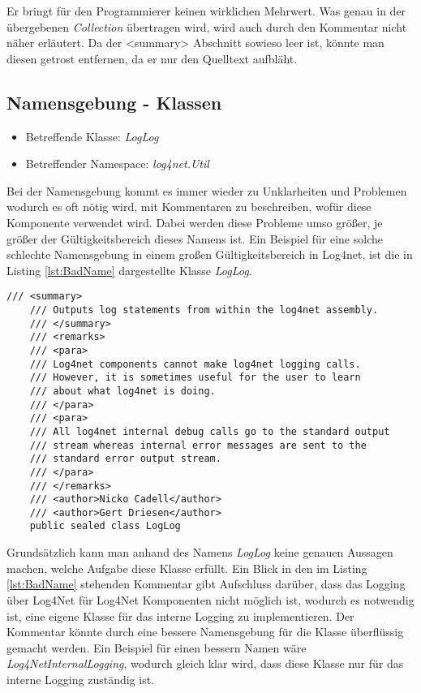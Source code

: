 Er bringt für den Programmierer keinen wirklichen Mehrwert. Was genau in der übergebenen \textit{Collection} übertragen wird, wird auch durch den Kommentar nicht näher erläutert. Da der <summary> Abschnitt sowieso leer ist, könnte man diesen getrost entfernen, da er nur den Quelltext aufbläht. 

\subsection{Namensgebung - Klassen}
\begin{itemize}
	\item Betreffende Klasse: \textit{LogLog}
	\item Betreffender Namespace: \textit{log4net.Util}
\end{itemize}

Bei der Namensgebung kommt es immer wieder zu Unklarheiten und Problemen wodurch es oft nötig wird, mit Kommentaren zu beschreiben, wofür diese Komponente verwendet wird. Dabei werden diese Probleme umso größer, je größer der Gültigkeitsbereich dieses Namens ist. Ein Beispiel für eine solche schlechte Namensgebung in einem großen Gültigkeitsbereich in Log4net, ist die in Listing \ref{lst:BadName} dargestellte Klasse \textit{LogLog}. 

\begin{lstlisting}[language={[Sharp]C}, caption=Beispiele für schlechte Namensgebung, label=lst:BadName]
/// <summary>
	/// Outputs log statements from within the log4net assembly.
	/// </summary>
	/// <remarks>
	/// <para>
	/// Log4net components cannot make log4net logging calls.
	/// However, it is sometimes useful for the user to learn 
	/// about what log4net is doing.
	/// </para>
	/// <para>
	/// All log4net internal debug calls go to the standard output 
	/// stream whereas internal error messages are sent to the 
	/// standard error output stream.
	/// </para>
	/// </remarks>
	/// <author>Nicko Cadell</author>
	/// <author>Gert Driesen</author>
	public sealed class LogLog
\end{lstlisting}

Grundsätzlich kann man anhand des Namens \textit{LogLog} keine genauen Aussagen machen, welche Aufgabe diese Klasse erfüllt. Ein Blick in den im Listing \ref{lst:BadName} stehenden Kommentar gibt Aufschluss darüber, dass das Logging über Log4Net für Log4Net Komponenten nicht möglich ist, wodurch es notwendig ist, eine eigene Klasse für das interne Logging zu implementieren. Der Kommentar könnte durch eine bessere Namensgebung für die Klasse überflüssig gemacht werden. Ein Beispiel für einen bessern Namen wäre \textit{Log4NetInternalLogging}, wodurch gleich klar wird, dass diese Klasse nur für das interne Logging zuständig ist. 


